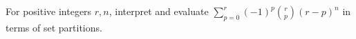 For positive integers $r,n$, interpret and evaluate $\sum_{p=0}^r(-1)^p\binom rp(r-p)^n$ in terms of set partitions.
